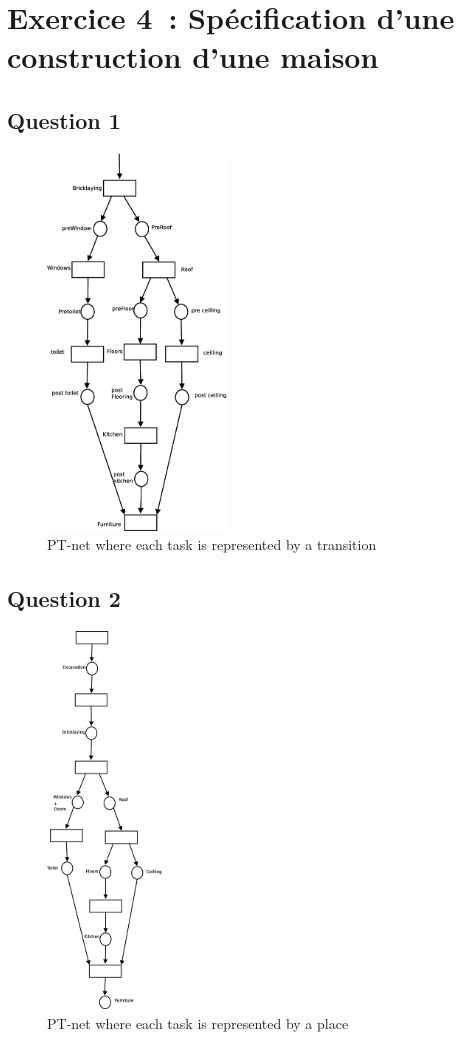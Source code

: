 \section*{Exercice 4~: Spécification d'une construction d'une maison}
\subsection*{Question 1}
\begin{figure}[h!]
\begin{center}
\includegraphics[height = 10cm]{exo41.eps} 
\caption{PT-net where each task is represented by a transition}
\end{center} 
\end{figure} 
\subsection*{Question 2}
\begin{figure}[h!]
\begin{center}
\includegraphics[height = 10cm]{exo42.eps} 
\caption{PT-net where each task is represented by a place}
\end{center} 
\end{figure}
